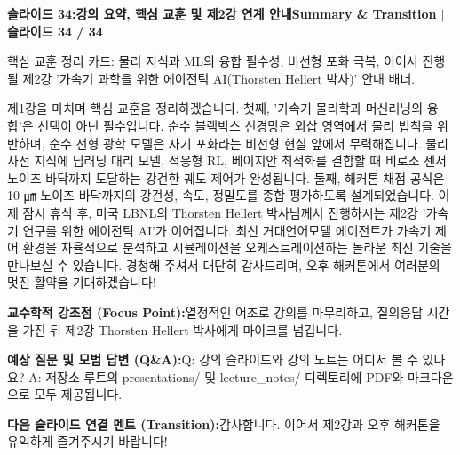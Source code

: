 \documentclass[11pt,a4paper]{article}
\begin{document}
\clearpage
\hypertarget{slide.34}{}
{}
\noindent\begin{tcolorbox}[colback=navy,colframe=navy,left=6pt,right=6pt,top=3pt,bottom=3pt,boxrule=0pt,arc=2pt]
{\large\bfseries\color{white}슬라이드 34:\enspace 강의 요약, 핵심 교훈 및 제2강 연계 안내}\hfill{\footnotesize\bfseries\color{white!85!lightbg}Summary \& Transition \enspace$|$\enspace 슬라이드 34 / 34}
\end{tcolorbox}
\vspace{0.2em}
\begin{tcolorbox}[colback=lightbg,colframe=bordergray,title={\footnotesize\bfseries\color{darkgray}슬라이드 시각 구성 요약},fontupper=\small,left=6pt,right=6pt,top=2.5pt,bottom=2.5pt,boxrule=0.6pt,arc=2.5pt]
핵심 교훈 정리 카드: 물리 지식과 ML의 융합 필수성, 비선형 포화 극복, 이어서 진행될 제2강 '가속기 과학을 위한 에이전틱 AI(Thorsten Hellert 박사)' 안내 배너.
\end{tcolorbox}
\vspace{0.2em}
\begin{tcolorbox}[colback=white,colframe=primaryblue,title={\footnotesize\bfseries\color{white}발표자 구두 대본 (Spoken Script)},fontupper=\small,left=6pt,right=6pt,top=3pt,bottom=3pt,boxrule=0.8pt,arc=2.5pt]
제1강을 마치며 핵심 교훈을 정리하겠습니다. 첫째, '가속기 물리학과 머신러닝의 융합'은 선택이 아닌 필수입니다. 순수 블랙박스 신경망은 외삽 영역에서 물리 법칙을 위반하며, 순수 선형 광학 모델은 자기 포화라는 비선형 현실 앞에서 무력해집니다. 물리 사전 지식에 딥러닝 대리 모델, 적응형 RL, 베이지안 최적화를 결합할 때 비로소 센서 노이즈 바닥까지 도달하는 강건한 궤도 제어가 완성됩니다. 둘째, 해커톤 채점 공식은 10 ㎛ 노이즈 바닥까지의 강건성, 속도, 정밀도를 종합 평가하도록 설계되었습니다. 이제 잠시 휴식 후, 미국 LBNL의 Thorsten Hellert 박사님께서 진행하시는 제2강 '가속기 연구를 위한 에이전틱 AI'가 이어집니다. 최신 거대언어모델 에이전트가 가속기 제어 환경을 자율적으로 분석하고 시뮬레이션을 오케스트레이션하는 놀라운 최신 기술을 만나보실 수 있습니다. 경청해 주셔서 대단히 감사드리며, 오후 해커톤에서 여러분의 멋진 활약을 기대하겠습니다!
\end{tcolorbox}
\vspace{0.2em}
\begin{tcolorbox}[colback=lightbg,colframe=bordergray,left=6pt,right=6pt,top=3pt,bottom=3pt,boxrule=0.6pt,arc=2.5pt]
\small
\noindent\textbf{\color{navy}교수학적 강조점 (Focus Point):}\enspace 열정적인 어조로 강의를 마무리하고, 질의응답 시간을 가진 뒤 제2강 Thorsten Hellert 박사에게 마이크를 넘깁니다.\par\vspace{0.3em}
\noindent\textbf{\color{successgreen}예상 질문 및 모범 답변 (Q\&A):}\enspace Q: 강의 슬라이드와 강의 노트는 어디서 볼 수 있나요? A: 저장소 루트의 presentations/ 및 lecture\_notes/ 디렉토리에 PDF와 마크다운으로 모두 제공됩니다.\par\vspace{0.3em}
\noindent\textbf{\color{accent}다음 슬라이드 연결 멘트 (Transition):}\enspace 감사합니다. 이어서 제2강과 오후 해커톤을 유익하게 즐겨주시기 바랍니다!
\end{tcolorbox}
\end{document}
